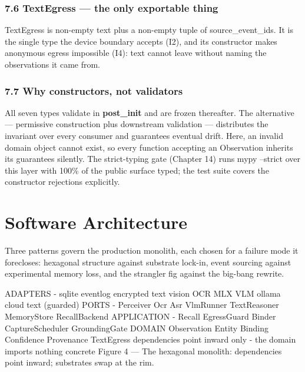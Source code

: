 \subsection{7.6 TextEgress --- the only exportable thing}\label{textegress-the-only-exportable-thing}

TextEgress is non-empty text plus a non-empty tuple of source\_event\_ids. It is the single type the device boundary accepts (I2), and its constructor makes anonymous egress impossible (I4): text cannot leave without naming the observations it came from.

\subsection{7.7 Why constructors, not validators}\label{why-constructors-not-validators}

All seven types validate in \textbf{post\_init} and are frozen thereafter. The alternative --- permissive construction plus downstream validation --- distributes the invariant over every consumer and guarantees eventual drift. Here, an invalid domain object cannot exist, so every function accepting an Observation inherits its guarantees silently. The strict-typing gate (Chapter 14) runs mypy --strict over this layer with 100\% of the public surface typed; the test suite covers the constructor rejections explicitly.

\chapter{Software Architecture}\label{software-architecture}

Three patterns govern the production monolith, each chosen for a failure mode it forecloses: hexagonal structure against substrate lock-in, event sourcing against experimental memory loss, and the strangler fig against the big-bang rewrite.

ADAPTERS - sqlite eventlog \textperiodcentered{} encrypted text \textperiodcentered{} vision OCR \textperiodcentered{} MLX VLM \textperiodcentered{} ollama \textperiodcentered{} cloud text (guarded) PORTS - Perceiver \textperiodcentered{} Ocr \textperiodcentered{} Asr \textperiodcentered{} VlmRunner \textperiodcentered{} TextReasoner \textperiodcentered{} MemoryStore \textperiodcentered{} RecallBackend APPLICATION - Recall \textperiodcentered{} EgressGuard \textperiodcentered{} Binder \textperiodcentered{} CaptureScheduler \textperiodcentered{} GroundingGate DOMAIN Observation \textperiodcentered{} Entity \textperiodcentered{} Binding \textperiodcentered{} Confidence \textperiodcentered{} Provenance \textperiodcentered{} TextEgress dependencies point inward only - the domain imports nothing concrete Figure 4 --- The hexagonal monolith: dependencies point inward; substrates swap at the rim.

